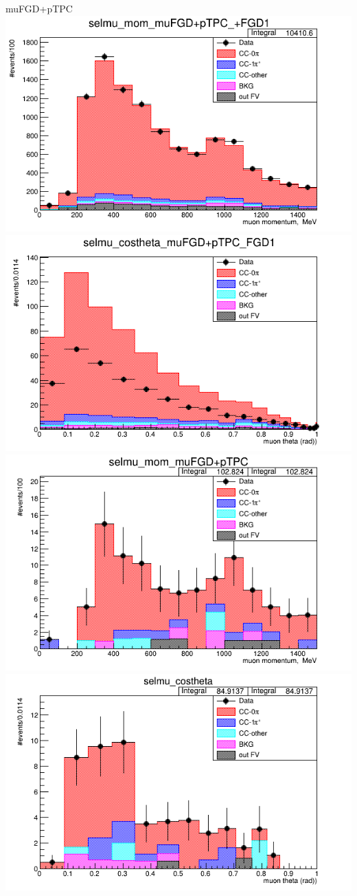\documentclass{beamer}
\begin{document}
\begin{frame}{muFGD+pTPC}
\center
\includegraphics[width=.45\textwidth]{images/selmu_mom_topology_muFGD+pTPC_accum_level[][0][310]_data_mc.png}
\includegraphics[width=.45\textwidth]{images/selmu_costheta_topology_muFGD+pTPC_accum_level[][0][310]_data_mc.png}
\includegraphics[width=.45\textwidth]{images/selmu_mom_fgd2topology_muFGD+pTPC_accum_level[][1][310]_data_mc.png}
\includegraphics[width=.45\textwidth]{images/selmu_costheta_fgd2topology_muFGD+pTPC_accum_level[][1][310]_data_mc.png}
\end{frame}
\end{document}
